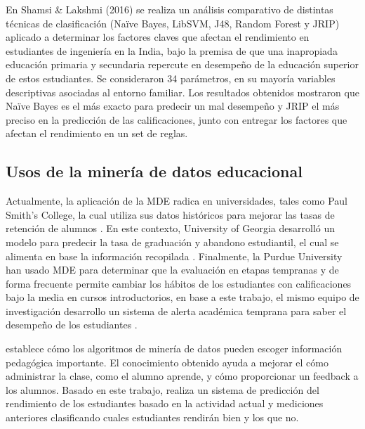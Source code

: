 En Shamsi & Lakshmi (2016) se realiza un análisis comparativo de distintas técnicas de clasificación (Na\"ive Bayes, LibSVM, J48, Random Forest y JRIP) aplicado a determinar los factores claves que afectan el rendimiento en estudiantes de ingeniería en la India, bajo la premisa de que una inapropiada educación primaria y secundaria repercute en desempeño de la educación superior de estos estudiantes. Se consideraron 34 parámetros, en su mayoría variables descriptivas asociadas al entorno familiar. Los resultados obtenidos mostraron que Naïve Bayes es el más exacto para predecir un mal desempeño y JRIP el más preciso en la predicción de las calificaciones, junto con entregar los factores que afectan el rendimiento en un set de reglas.

\subsection{Usos de la minería de datos educacional}


Actualmente, la aplicación de la MDE radica en universidades, tales como Paul Smith’s College, la cual utiliza sus datos históricos para mejorar las tasas de retención de alumnos \parencite{bichsel2012analytics}. En este contexto, University of Georgia desarrolló un modelo para predecir la tasa de graduación y abandono estudiantil, el cual se alimenta en base la información recopilada \parencite{morris2005predicting}. Finalmente, la Purdue University han usado MDE para determinar que la evaluación en etapas tempranas y de forma frecuente permite cambiar los hábitos de los estudiantes con calificaciones bajo la media en cursos introductorios, en base a este trabajo, el mismo equipo de investigación desarrollo un sistema de alerta académica temprana para saber el desempeño de los estudiantes \parencite{baepler2010academic}. 

\textcite{merceron2005educational} establece cómo los algoritmos de minería de datos pueden escoger información pedagógica importante. El conocimiento obtenido ayuda a mejorar el cómo administrar la clase, como el alumno aprende, y cómo proporcionar un feedback a los alumnos. Basado en este trabajo, \textcite{abdullah2014students} realiza un sistema de predicción del rendimiento de los estudiantes basado en la actividad actual y mediciones anteriores clasificando cuales estudiantes rendirán bien y los que no. 

